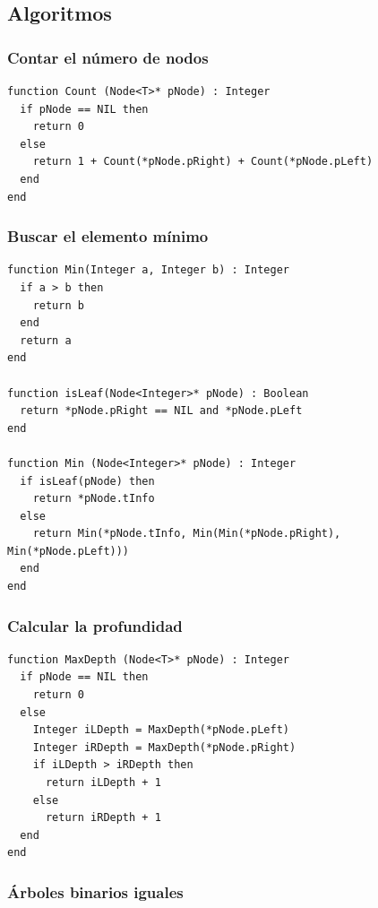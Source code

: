 \subsection{Algoritmos}

\subsubsection{Contar el número de nodos}

\begin{lstlisting}[upquote=true, language=pseudo]
function Count (Node<T>* pNode) : Integer
  if pNode == NIL then
    return 0
  else
    return 1 + Count(*pNode.pRight) + Count(*pNode.pLeft)
  end
end
\end{lstlisting}

\subsubsection{Buscar el elemento mínimo}

\begin{lstlisting}[upquote=true, language=pseudo]
function Min(Integer a, Integer b) : Integer
  if a > b then
    return b
  end
  return a
end

function isLeaf(Node<Integer>* pNode) : Boolean
  return *pNode.pRight == NIL and *pNode.pLeft
end

function Min (Node<Integer>* pNode) : Integer
  if isLeaf(pNode) then
    return *pNode.tInfo
  else
    return Min(*pNode.tInfo, Min(Min(*pNode.pRight), Min(*pNode.pLeft)))
  end
end
\end{lstlisting}

\subsubsection{Calcular la profundidad}

\begin{lstlisting}[upquote=true, language=pseudo]
function MaxDepth (Node<T>* pNode) : Integer
  if pNode == NIL then
    return 0
  else
    Integer iLDepth = MaxDepth(*pNode.pLeft)
    Integer iRDepth = MaxDepth(*pNode.pRight)
    if iLDepth > iRDepth then
      return iLDepth + 1
    else
      return iRDepth + 1
  end
end
\end{lstlisting}

\subsubsection{Árboles binarios iguales}

